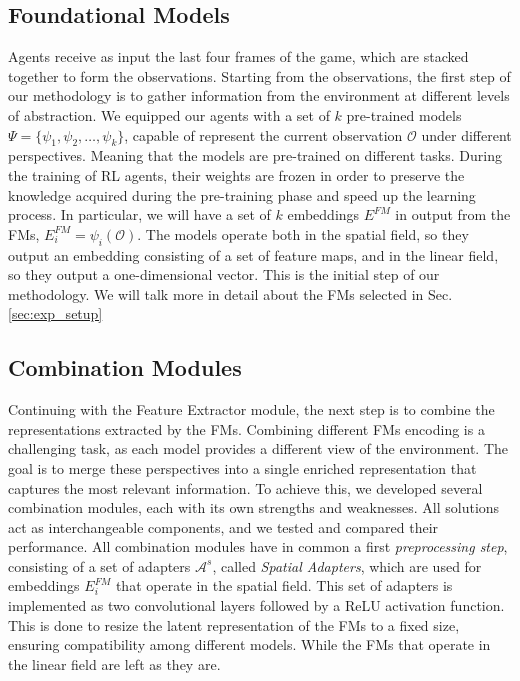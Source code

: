 \subsection{Foundational Models}\label{subsec:foundational-models}
Agents receive as input the last four frames of the game, which are stacked together to form the observations.
Starting from the observations, the first step of our methodology is to gather information from the environment at different levels of abstraction.
We equipped our agents with a set of $k$ pre-trained models $\Psi = \{\psi_1, \psi_2, \ldots, \psi_k\}$, capable of represent the current observation $\mathcal{O}$ under different perspectives.
Meaning that the models are pre-trained on different tasks.
During the training of RL agents, their weights are frozen in order to preserve the knowledge acquired during the pre-training phase and speed up the learning process.
In particular, we will have a set of $k$ embeddings $E^{FM}$ in output from the FMs, $E^{FM}_i = \psi_i(\mathcal{O})$.
The models operate both in the spatial field, so they output an embedding consisting of a set of feature maps, and in the linear field, so they output a one-dimensional vector.
This is the initial step of our methodology.
We will talk more in detail about the FMs selected in Sec. \ref{sec:exp_setup}

\subsection{Combination Modules}\label{subsec:combination-modules}
Continuing with the Feature Extractor module, the next step is to combine the representations extracted by the FMs.
Combining different FMs encoding is a challenging task, as each model provides a different view of the environment.
The goal is to merge these perspectives into a single enriched representation that captures the most relevant information.
To achieve this, we developed several combination modules, each with its own strengths and weaknesses.
All solutions act as interchangeable components, and we tested and compared their performance.
All combination modules have in common a first \textit{preprocessing step}, consisting of a set of adapters $\mathcal{A}^{s}$, called \textit{Spatial Adapters}, which are used for embeddings $E^{FM}_i$ that operate in the spatial field.
This set of adapters is implemented as two convolutional layers followed by a ReLU activation function.
This is done to resize the latent representation of the FMs to a fixed size, ensuring compatibility among different models.
While the FMs that operate in the linear field are left as they are.

